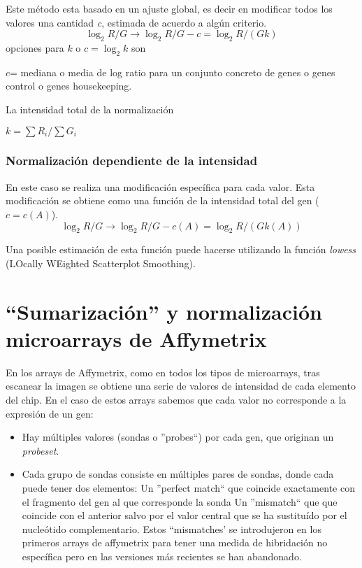 Este m\'etodo esta basado en un ajuste global, es decir en modificar todos los valores una cantidad \emph{c}, estimada de acuerdo a alg\'un criterio.
\begin{equation}
 \log_2 R/G \rightarrow \log_2 R/G-c=\log_2 R/(Gk)
\end{equation}
opciones para $k$ o $c= \log_2k$ son

$c$= mediana o media de log ratio para un conjunto concreto de genes o genes control o genes housekeeping.

La intensidad total de la normalizaci\'on

$k=\sum R_i/\sum G_i$

\subsubsection{\textbf{Normalizaci\'on dependiente de la intensidad}}
En este caso se realiza una modificaci\'on espec\'ifica para cada valor. Esta modificaci\'on se obtiene como una funci\'on de la intensidad total del gen ($c=c(A)$).
\begin{equation}
 \log_2 R/G \rightarrow \log_2 R/G-c(A)=\log_2 R/(Gk(A))
\end{equation}

Una posible estimaci\'on de esta funci\'on puede hacerse utilizando la funci\'on \emph{lowess} (LOcally WEighted  Scatterplot Smoothing).

\section{``Sumarizaci\'on'' y normalizaci\'on microarrays de Affymetrix}


En los arrays de Affymetrix, como en todos los tipos de microarrays, tras escanear la imagen se obtiene una serie de valores de
intensidad de cada elemento del chip.
En el caso de estos arrays sabemos que cada valor no corresponde a la expresi\'on de un gen:

\begin{itemize}
\item Hay m\'ultiples valores (sondas o ''probes``) por cada gen, que originan un \emph{probeset}.
\item Cada grupo de sondas  consiste en m\'ultiples pares de sondas, donde cada puede tener  dos elementos:
\subitem Un ''perfect match`` que coincide exactamente con el fragmento del gen al que corresponde la sonda
\subitem Un ''mismatch`` que que coincide con el anterior salvo por el valor central que se ha sustitu\'ido por el nucle\'otido complementario.
Estos ``mismatches' se introdujeron en los primeros arrays de affymetrix para tener una medida de hibridaci\'on no espec\'ifica pero en las versiones m\'as recientes se han abandonado.

\end{itemize}



